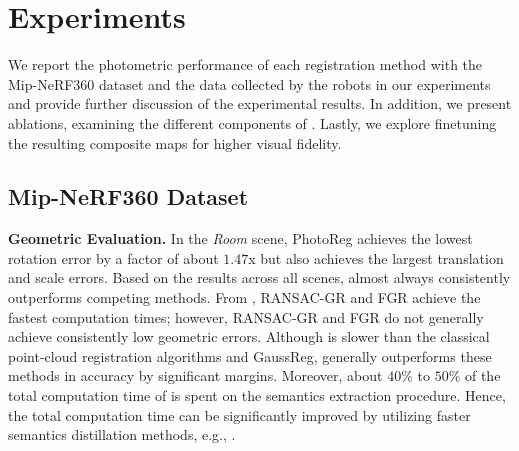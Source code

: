 \section{Experiments}
\label{sec:appendix_experiments}
We report the photometric performance of each registration method with the Mip-NeRF360 dataset and the data collected by the robots in our experiments and provide further discussion of the experimental results. In addition, we present ablations, examining the different components of \algname. Lastly, we explore finetuning the resulting composite maps for higher visual fidelity.

\subsection{Mip-NeRF360 Dataset}
\label{ssec:appendix_experiments_mip_nerf_360}
\smallskip
\noindent\textbf{Geometric Evaluation.}
In the \emph{Room} scene, PhotoReg achieves the lowest rotation error by a factor of about $1.47$x but also achieves the largest translation and scale errors. 
Based on the results across all scenes, \algname almost always consistently outperforms competing methods. From , RANSAC-GR and FGR achieve the fastest computation times; however, RANSAC-GR and FGR do not generally achieve consistently low geometric errors. Although \algname is slower than the classical point-cloud registration algorithms and GaussReg, \algname generally outperforms these methods in accuracy by significant margins. Moreover, about $40\%$ to $50\%$ of the total computation time of \algname is spent on the semantics extraction procedure. Hence, the total computation time can be significantly improved by utilizing faster semantics distillation methods, e.g., \cite{shorinwa2024fast}.


